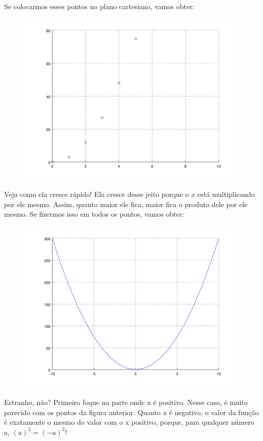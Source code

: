 \documentclass[11pt]{article}
\begin{document}
\paragraph{}
Se colocarmos esses pontos no plano cartesiano, 
vamos obter:
\begin{figure}[H]
	\centering
	\includegraphics[width=0.8\linewidth]{imgs2/chart1.png}
\end{figure}
Veja como ela cresce rápido! Ela cresce desse jeito porque o $x$ está 
multiplicando por ele mesmo. Assim, quanto maior ele fica, maior fica o
produto dele por ele mesmo. Se fizermos isso em todos os pontos, vamos
obter:
\begin{figure}[H]
	\centering
	\includegraphics[width=0.8\linewidth]{imgs2/chart2.png}
\end{figure}
Estranho, não? Primeiro foque na parte onde x é positivo. Nesse caso, é
muito parecido com os pontos da figura anterior. Quanto x é negativo, o 
valor da função é exatamente o mesmo do valor com o x positivo, porque,
para qualquer número a, ${(a)}^2 = {(-a)}^2$! 
\end{document}
